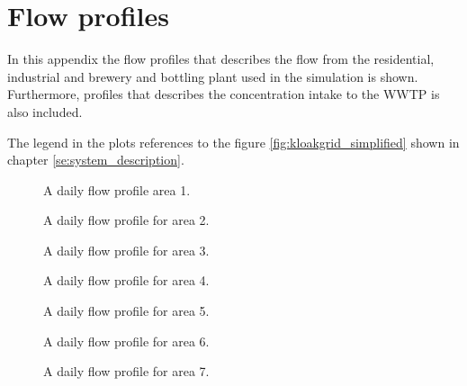 \newpage
\section{Flow profiles}\label{app:flow_profiles}
In this appendix the flow profiles that describes the flow from the residential, industrial and brewery and bottling plant used in the simulation is shown. Furthermore, profiles that describes the concentration intake to the WWTP is also included.

The legend in the plots references to the figure \ref{fig:kloakgrid_simplified} shown in chapter \ref{se:system_description}. 


\begin{figure}[H]
\centering

\caption{A daily flow profile area 1.}
\label{fig:APP_flow_profile_thulevej}
\end{figure} 

\begin{figure}[H]
\centering

\caption{A daily flow profile for area 2.}
\label{fig:APP_flow_profile_zone2}
\end{figure} 

\begin{figure}[H]
\centering

\caption{A daily flow profile for area 3.}
\label{fig:APP_flow_profile_zone3}
\end{figure} 

\begin{figure}[H]
\centering

\caption{A daily flow profile for area 4.}
\label{fig:APP_flow_profile_zone4}
\end{figure} 

\begin{figure}[H]
\centering

\caption{A daily flow profile for area 5.}
\label{fig:APP_flow_profile_zone5}
\end{figure} 

\begin{figure}[H]
\centering

\caption{A daily flow profile for area 6.}
\label{fig:APP_flow_profile_zone6}
\end{figure} 

\begin{figure}[H]
\centering

\caption{A daily flow profile for area 7.}
\label{fig:APP_flow_profile_zone7}
\end{figure} 

